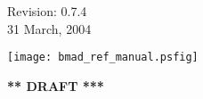 \thispagestyle{empty}

\begin{flushright}
\large
  Revision: 0.7.4 \\
  31 March, 2004 \\
\end{flushright}

\vfill

{
\begin{center}
\texttt{[image: bmad\_ref\_manual.psfig]} \\
\end{center}
}

\vskip 1in
\begin{center}
{\Huge \bf *** DRAFT ***}
\end{center}
\vfill
\break